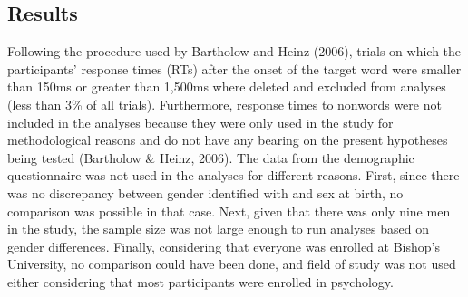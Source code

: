 \documentclass[authordate, serif, review]{jote-article}
\begin{document}
\begin{multicols}{2}
{}
\section*{Results} \gotoreview
\label{sec:results}
\noindent Following the procedure used by Bartholow and Heinz (2006), trials on which the participants' response times (RTs) after the onset of the target word were smaller than 150ms or greater than 1,500ms where deleted and excluded from analyses (less than 3\% of all trials). Furthermore, response times to nonwords were not included in the analyses because they were only used in the study for methodological reasons and do not have any bearing on the present hypotheses being tested (Bartholow \& Heinz, 2006). The data from the demographic questionnaire was not used in the analyses for different reasons. First, since there was no discrepancy between gender identified with and sex at birth, no comparison was possible in that case. Next, given that there was only nine men in the study, the sample size was not large enough to run analyses based on gender differences. Finally, considering that everyone was enrolled at Bishop's University, no comparison could have been done, and field of study was not used either considering that most participants were enrolled in psychology.

{}

\end{multicols}
\end{document}
